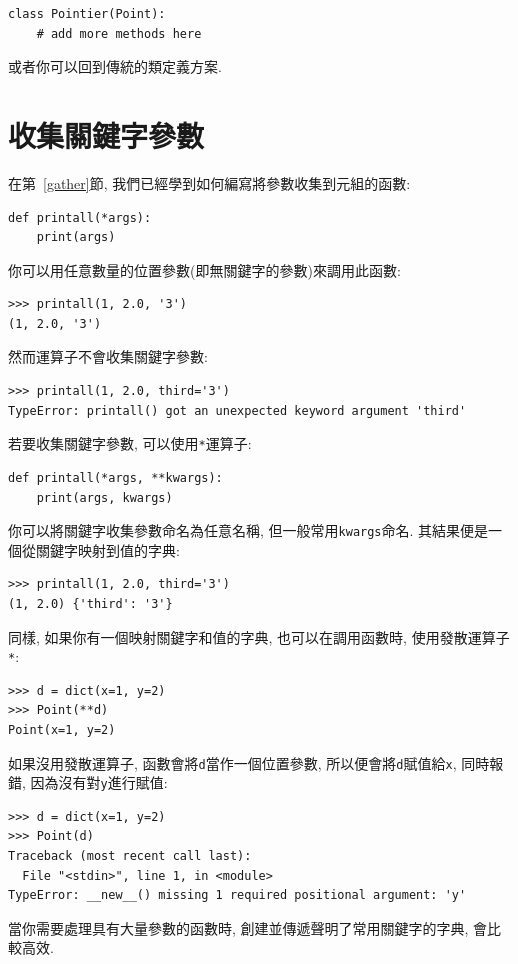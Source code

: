 \documentclass[10pt]{book}
\begin{document}
\begin{verbatim}
class Pointier(Point):
    # add more methods here
\end{verbatim}

或者你可以回到傳統的類定義方案. 


\section{收集關鍵字參數}

在第~\ref{gather}節, 我們已經學到如何編寫將參數收集到元組的函數:

\begin{verbatim}
def printall(*args):
    print(args)
\end{verbatim}
%
你可以用任意數量的位置參數(即無關鍵字的參數)來調用此函數:

\begin{verbatim}
>>> printall(1, 2.0, '3')
(1, 2.0, '3')
\end{verbatim}
%
然而{\tt *}運算子不會收集關鍵字參數:

\begin{verbatim}
>>> printall(1, 2.0, third='3')
TypeError: printall() got an unexpected keyword argument 'third'
\end{verbatim}
%
若要收集關鍵字參數, 可以使用{\tt **}運算子:

\begin{verbatim}
def printall(*args, **kwargs):
    print(args, kwargs)
\end{verbatim}
%
你可以將關鍵字收集參數命名為任意名稱, 但一般常用{\tt kwargs}命名. 
其結果便是一個從關鍵字映射到值的字典:

\begin{verbatim}
>>> printall(1, 2.0, third='3')
(1, 2.0) {'third': '3'}
\end{verbatim}
%
同樣, 如果你有一個映射關鍵字和值的字典, 也可以在調用函數時, 
使用發散運算子{\tt **}:

\begin{verbatim}
>>> d = dict(x=1, y=2)
>>> Point(**d)
Point(x=1, y=2)
\end{verbatim}
%
如果沒用發散運算子, 函數會將{\tt d}當作一個位置參數, 
所以便會將{\tt d}賦值給{\tt x}, 同時報錯, 因為沒有對{\tt y}進行賦值:

\begin{verbatim}
>>> d = dict(x=1, y=2)
>>> Point(d)
Traceback (most recent call last):
  File "<stdin>", line 1, in <module>
TypeError: __new__() missing 1 required positional argument: 'y'
\end{verbatim}
%
當你需要處理具有大量參數的函數時, 
創建並傳遞聲明了常用關鍵字的字典, 會比較高效. 
\end{document}
